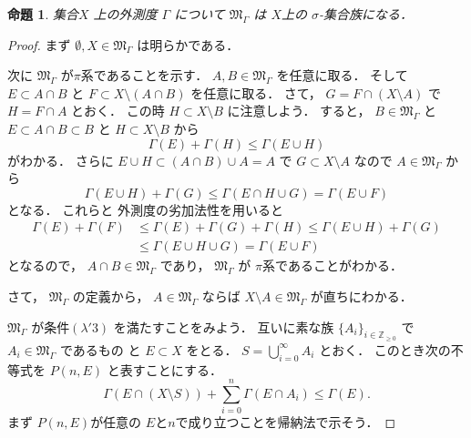 \documentclass[leqno, a4paper, 12pt]{jsarticle}
\newtheorem{prop}[thm]{命題}
\newcommand{\zz}{\mathbb{Z}}
\begin{document}
\begin{prop}\label{prop:gaisoku}
集合$X$
上の外測度
$\Gamma$
について
$\mathfrak{M}_{\Gamma}$
は
$X$上の
$\sigma$-集合族になる．
\end{prop}

\begin{proof}
まず
$\emptyset, X\in \mathfrak{M}_{\Gamma}$
は明らかである．

次に
$\mathfrak{M}_{\Gamma}$
が$\pi$系であることを示す．
$A, B\in \mathfrak{M}_{\Gamma}$
を任意に取る．
そして
$E\subset A\cap B$
と
$F\subset X\setminus (A\cap B)$
を任意に取る．
さて，
$G=F\cap (X\setminus A)$
で
$H=F\cap A$
とおく．
この時
$H\subset X\setminus B$
に注意しよう．
すると，
$B\in \mathfrak{M}_{\Gamma}$
と
$E\subset A\cap B\subset B$
と
$H\subset X\setminus B$
から
\[
\Gamma(E)+\Gamma(H)\le \Gamma(E\cup H)
\]
がわかる．
さらに
$E\cup H\subset (A\cap B)\cup A=A$
で
$G\subset X\setminus A$
なので
$A\in \mathfrak{M}_{\Gamma}$
から
\[
\Gamma(E\cup H)+\Gamma(G)\le 
\Gamma(E\cap H\cup G)=\Gamma(E\cup F)
\]
となる．
これらと
外測度の劣加法性を用いると
\begin{align*}
\Gamma(E)+\Gamma(F)
&\le \Gamma(E)+\Gamma(G)+\Gamma(H)
\le \Gamma(E\cup H)+\Gamma(G)\\
&\le \Gamma(E\cup H\cup G)
=\Gamma(E\cup F)
\end{align*}
となるので，
$A\cap B\in \mathfrak{M}_{\Gamma}$
であり，
$\mathfrak{M}_{\Gamma}$
が
$\pi$系であることがわかる．

さて，
$\mathfrak{M}_{\Gamma}$
の定義から，
$A\in \mathfrak{M}_{\Gamma}$
ならば
$X\setminus A\in \mathfrak{M}_{\Gamma}$
が直ちにわかる．

$\mathfrak{M}_{\Gamma}$
が条件$(\lambda'3)$
を満たすことをみよう．
互いに素な族
$\{A_{i}\}_{i\in \zz_{\ge 0}}$
で
$A_{i}\in \mathfrak{M}_{\Gamma}$
であるもの
と
$E\subset X$
をとる．
$S=\bigcup_{i=0}^{\infty}A_{i}$
とおく．
このとき次の不等式を
$P(n, E)$
と表すことにする．
\[
\Gamma(E\cap (X\setminus S))+
\sum_{i=0}^{n}\Gamma(E\cap A_{i})
\le \Gamma(E). 
\]
まず
$P(n, E)$が任意の
$E$と$n$で成り立つことを帰納法で示そう．


\end{proof}
\end{document}
